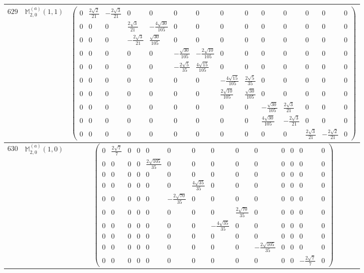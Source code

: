 \documentclass[fleqn,8pt,landscape]{jsarticle}
\begin{document}
\begin{center}
\begin{longtable}{ccc}
$ 629 $ & $ \mathbb{M}_{2,0}^{(a)}(1,1) $ & $ \begin{pmatrix} 0 & \frac{2 \sqrt{2}}{21} & - \frac{2 \sqrt{3}}{21} & 0 & 0 & 0 & 0 & 0 & 0 & 0 & 0 & 0 & 0 & 0 \\ 0 & 0 & 0 & \frac{2 \sqrt{3}}{21} & - \frac{4 \sqrt{30}}{105} & 0 & 0 & 0 & 0 & 0 & 0 & 0 & 0 & 0 \\ 0 & 0 & 0 & - \frac{2 \sqrt{3}}{21} & \frac{\sqrt{30}}{105} & 0 & 0 & 0 & 0 & 0 & 0 & 0 & 0 & 0 \\ 0 & 0 & 0 & 0 & 0 & - \frac{\sqrt{30}}{105} & - \frac{2 \sqrt{10}}{105} & 0 & 0 & 0 & 0 & 0 & 0 & 0 \\ 0 & 0 & 0 & 0 & 0 & - \frac{2 \sqrt{5}}{35} & \frac{4 \sqrt{15}}{105} & 0 & 0 & 0 & 0 & 0 & 0 & 0 \\ 0 & 0 & 0 & 0 & 0 & 0 & 0 & - \frac{4 \sqrt{15}}{105} & \frac{2 \sqrt{5}}{35} & 0 & 0 & 0 & 0 & 0 \\ 0 & 0 & 0 & 0 & 0 & 0 & 0 & \frac{2 \sqrt{10}}{105} & \frac{\sqrt{30}}{105} & 0 & 0 & 0 & 0 & 0 \\ 0 & 0 & 0 & 0 & 0 & 0 & 0 & 0 & 0 & - \frac{\sqrt{30}}{105} & \frac{2 \sqrt{3}}{21} & 0 & 0 & 0 \\ 0 & 0 & 0 & 0 & 0 & 0 & 0 & 0 & 0 & \frac{4 \sqrt{30}}{105} & - \frac{2 \sqrt{3}}{21} & 0 & 0 & 0 \\ 0 & 0 & 0 & 0 & 0 & 0 & 0 & 0 & 0 & 0 & 0 & \frac{2 \sqrt{3}}{21} & - \frac{2 \sqrt{2}}{21} & 0 \end{pmatrix} $ \\ \hline
$ 630 $ & $ \mathbb{M}_{2,0}^{(a)}(1,0) $ & $ \begin{pmatrix} 0 & \frac{2 \sqrt{7}}{7} & 0 & 0 & 0 & 0 & 0 & 0 & 0 & 0 & 0 & 0 & 0 & 0 \\ 0 & 0 & 0 & 0 & \frac{2 \sqrt{105}}{35} & 0 & 0 & 0 & 0 & 0 & 0 & 0 & 0 & 0 \\ 0 & 0 & 0 & 0 & 0 & 0 & 0 & 0 & 0 & 0 & 0 & 0 & 0 & 0 \\ 0 & 0 & 0 & 0 & 0 & 0 & \frac{4 \sqrt{35}}{35} & 0 & 0 & 0 & 0 & 0 & 0 & 0 \\ 0 & 0 & 0 & 0 & 0 & - \frac{2 \sqrt{70}}{35} & 0 & 0 & 0 & 0 & 0 & 0 & 0 & 0 \\ 0 & 0 & 0 & 0 & 0 & 0 & 0 & 0 & \frac{2 \sqrt{70}}{35} & 0 & 0 & 0 & 0 & 0 \\ 0 & 0 & 0 & 0 & 0 & 0 & 0 & - \frac{4 \sqrt{35}}{35} & 0 & 0 & 0 & 0 & 0 & 0 \\ 0 & 0 & 0 & 0 & 0 & 0 & 0 & 0 & 0 & 0 & 0 & 0 & 0 & 0 \\ 0 & 0 & 0 & 0 & 0 & 0 & 0 & 0 & 0 & - \frac{2 \sqrt{105}}{35} & 0 & 0 & 0 & 0 \\ 0 & 0 & 0 & 0 & 0 & 0 & 0 & 0 & 0 & 0 & 0 & 0 & - \frac{2 \sqrt{7}}{7} & 0 \end{pmatrix} $ \\ \hline

\end{longtable}
\end{center}
\end{document}
